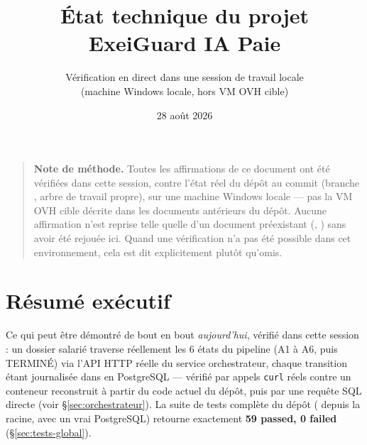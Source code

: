 \documentclass[11pt,a4paper]{article}
\title{\'Etat technique du projet ExeiGuard IA Paie}
\author{V\'erification en direct dans une session de travail locale\\(machine Windows locale, hors VM OVH cible)}
\date{28 ao\^ut 2026}
\begin{document}
\maketitle

\begin{quote}
\small
\textbf{Note de m\'ethode.} Toutes les affirmations de ce document ont \'et\'e v\'erifi\'ees dans cette session, contre l'\'etat r\'eel du d\'ep\^ot au commit  (branche , arbre de travail propre), sur une machine Windows locale --- pas la VM OVH cible d\'ecrite dans les documents ant\'erieurs du d\'ep\^ot. Aucune affirmation n'est reprise telle quelle d'un document pr\'eexistant (, ) sans avoir \'et\'e rejou\'ee ici. Quand une v\'erification n'a pas \'et\'e possible dans cet environnement, cela est dit explicitement plut\^ot qu'omis.
\end{quote}

\tableofcontents

\section{R\'esum\'e ex\'ecutif}

Ce qui peut \^etre d\'emontr\'e de bout en bout \emph{aujourd'hui}, v\'erifi\'e dans cette session : un dossier salari\'e traverse r\'eellement les 6 \'etats du pipeline (A1 \`a A6, puis TERMIN\'E) via l'API HTTP r\'eelle du service orchestrateur, chaque transition \'etant journalis\'ee dans  en PostgreSQL --- v\'erifi\'e par appels \texttt{curl} r\'eels contre un conteneur reconstruit \`a partir du code actuel du d\'ep\^ot, puis par une requ\^ete SQL directe (voir \S\ref{sec:orchestrateur}). La suite de tests compl\`ete du d\'ep\^ot ( depuis la racine, avec un vrai PostgreSQL) retourne exactement \textbf{59 passed, 0 failed} (\S\ref{sec:tests-global}).
\end{document}

